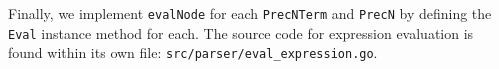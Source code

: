 Finally, we implement \verb|evalNode| for each \verb|PrecNTerm| and \verb|PrecN| by defining the \verb|Eval| instance method for each. The source code for expression evaluation is found within its own file: \verb|src/parser/eval_expression.go|.

\inputminted[firstline=182, lastline=194, fontsize=\footnotesize, autogobble, breaklines, tabsize=4]{go}{../../src/parser/eval_expression.go}
